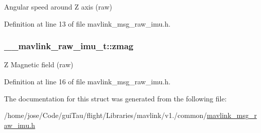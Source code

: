 Angular speed around Z axis (raw) 



Definition at line 13 of file mavlink\-\_\-msg\-\_\-raw\-\_\-imu.\-h.

\hypertarget{struct____mavlink__raw__imu__t_a9c91b2950a80f2598bb7c1ed484cb74a}{
\subsubsection[{zmag}]{ \-\_\-\-\_\-mavlink\-\_\-raw\-\_\-imu\-\_\-t\-::zmag}}\label{struct____mavlink__raw__imu__t_a9c91b2950a80f2598bb7c1ed484cb74a}


Z Magnetic field (raw) 



Definition at line 16 of file mavlink\-\_\-msg\-\_\-raw\-\_\-imu.\-h.



The documentation for this struct was generated from the following file\-:\begin{DoxyCompactItemize}
\item 
/home/jose/\-Code/gui\-Tau/flight/\-Libraries/mavlink/v1./common/\hyperlink{mavlink__msg__raw__imu_8h}{mavlink\-\_\-msg\-\_\-raw\-\_\-imu.\-h}\end{DoxyCompactItemize}

